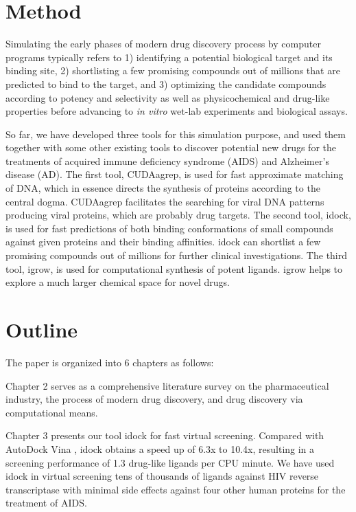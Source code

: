 \section{Method}

Simulating the early phases of modern drug discovery process by computer programs typically refers to 1) identifying a potential biological target and its binding site, 2) shortlisting a few promising compounds out of millions that are predicted to bind to the target, and 3) optimizing the candidate compounds according to potency and selectivity as well as physicochemical and drug-like properties before advancing to \textit{in vitro} wet-lab experiments and biological assays.

So far, we have developed three tools for this simulation purpose, and used them together with some other existing tools to discover potential new drugs for the treatments of acquired immune deficiency syndrome (AIDS) and Alzheimer's disease (AD). The first tool, CUDAagrep, is used for fast approximate matching of DNA, which in essence directs the synthesis of proteins according to the central dogma. CUDAagrep facilitates the searching for viral DNA patterns producing viral proteins, which are probably drug targets. The second tool, idock, is used for fast predictions of both binding conformations of small compounds against given proteins and their binding affinities. idock can shortlist a few promising compounds out of millions for further clinical investigations. The third tool, igrow, is used for computational synthesis of potent ligands. igrow helps to explore a much larger chemical space for novel drugs.

\section{Outline}

The paper is organized into 6 chapters as follows:

Chapter 2 serves as a comprehensive literature survey on the pharmaceutical industry, the process of modern drug discovery, and drug discovery via computational means.

Chapter 3 presents our tool idock for fast virtual screening. Compared with AutoDock Vina \citep{595}, idock obtains a speed up of 6.3x to 10.4x, resulting in a screening performance of 1.3 drug-like ligands per CPU minute. We have used idock in virtual screening tens of thousands of ligands against HIV reverse transcriptase with minimal side effects against four other human proteins for the treatment of AIDS.

